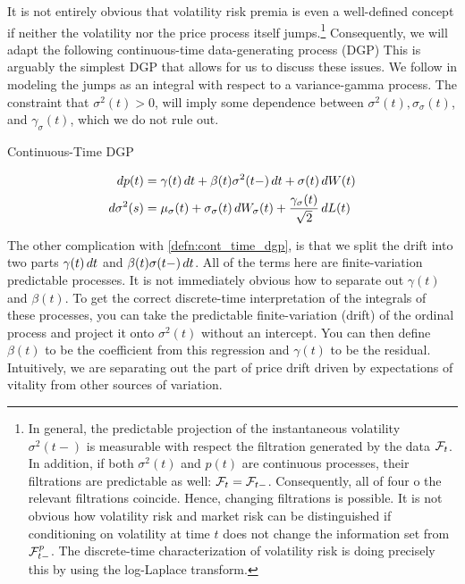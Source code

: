\documentclass[11pt, letterpaper, twoside, final]{article}
\begin{document}
It is not entirely obvious that volatility risk premia is even a well-defined concept if neither the volatility
nor the price process itself jumps.\footnote{In general, the predictable projection of the instantaneous
    volatility $\sigma^2(t-)$ is measurable with respect the filtration generated by the data $\mathcal{F}_t$. In addition,
    if both $\sigma^2(t)$ and $p(t)$ are continuous processes, their filtrations are predictable as well: $\mathcal{F}_t =
    \mathcal{F}_{t-}$. Consequently, all of four o the relevant filtrations coincide. Hence, changing filtrations is
    possible. It is not obvious how volatility risk and market risk can be distinguished if conditioning on
    volatility at time $t$ does not change the information set from $\mathcal{F}^p_{t-}$. The discrete-time
characterization of volatility risk is doing precisely this by using the log-Laplace transform.}
Consequently, we will adapt the following continuous-time data-generating process (DGP)
This is arguably the simplest DGP that allows for us to discuss these issues. 
We follow \textcite{sangrey2018jumps} in modeling the jumps as an integral with respect to a variance-gamma
process.
The constraint that $\sigma^2(t) > 0$, will imply some dependence between $\sigma^2(t), \sigma_{\sigma}(t)$, and
$\gamma_{\sigma}(t)$, which we do not rule out.



\begin{defn}{Continuous-Time DGP}
    \label{defn:cont_time_dgp}

    \begin{align}
        \mathop{}\!d p(t) &= \gamma(t) \mathop{}\!d t + \beta(t) \sigma^2(t-) \mathop{}\!d t + \sigma(t) \mathop{}\!d W(t)  \\
        \mathop{}\!d \sigma^2(s)  &= \mu_{\sigma}(t) + \sigma_{\sigma}(t) \mathop{}\!d W_{\sigma}(t) +
        \frac{\gamma_{\sigma}(t)}{\sqrt{2}} \mathop{}\!d L(t) 
    \end{align}

\end{defn}

The other complication with \cref{defn:cont_time_dgp}, is that we split the drift into two parts $\gamma(t)\mathop{}\!d t$
and $\beta(t) \sigma(t-) \mathop{}\!d t$. 
All of the terms here are finite-variation predictable processes.
It is not immediately obvious how to separate out $\gamma(t)$ and $\beta(t)$.
To get the correct discrete-time interpretation of the integrals of these processes, you can take the predictable
finite-variation (drift) of the ordinal process and project it onto $\sigma^2(t)$ without an intercept.
You can then define $\beta(t)$ to be the coefficient from this regression and $\gamma(t)$ to be the residual.
Intuitively, we are separating out the part of price drift driven by expectations of vitality from other sources
of variation.
\end{document}
